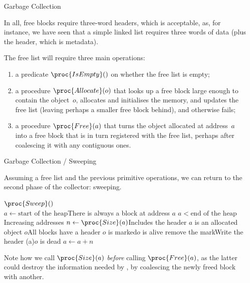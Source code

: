 \documentclass[compress,dvipdfmx]{beamer}
\begin{document}
%
\begin{frame}{Garbage Collection}

  In all, free blocks require three-word headers, which is acceptable,
  as, for instance, we have seen that a simple linked list requires
  three words of data (plus the header, which is metadata).

  \bigskip

  The free list will require three main operations:
  \begin{enumerate}

    \item a predicate \(\proc{IsEmpty}()\) on whether the free list is
      empty;

    \item a procedure \(\proc{Allocate}(o)\) that looks up a free
      block large enough to contain the object~\(o\), allocates and
      initialises the memory, and updates the free list (leaving
      perhaps a smaller free block behind), and otherwise fails;

    \item a procedure \(\proc{Free}(a)\) that turns the object
      allocated at address~\(a\) into a free block that is in turn
      registered with the free list, perhaps after coalescing it with
      any contiguous ones.

  \end{enumerate}

\end{frame}

%
\begin{frame}{Garbage Collection / Sweeping}

  Assuming a free list and the previous primitive operations, we can
  return to the second phase of the collector: sweeping.
  \begin{codebox}
    \(\proc{Sweep}()\)\\
    \li \(a \gets \text{start of the heap}\)\RComment There is always a
    block at address \(a\)
    \li \While \(a < \text{end of the heap}\) \RComment
    Increasing addresses
    \li \> \(n \gets \proc{Size}(a)\)\RComment Includes the header
    \li \> \If \(a\) is an allocated object \(o\)\RComment All blocks
    have a header
    \li    \Then \If \(o\) is marked\RComment \(o\) is alive
    \li          \Then remove the mark\RComment Write the header
    \li          \Else {}(a)\RComment \(o\) is dead
                 \End
           \End
    \li \> \(a \gets a + n\)
  \end{codebox}
  Note how we call \(\proc{Size}(a)\) \emph{before} calling
  \(\proc{Free}(a)\), as the latter could destroy the information
  needed by , by coalescing the newly freed block with
  another.

\end{frame}
\end{document}

